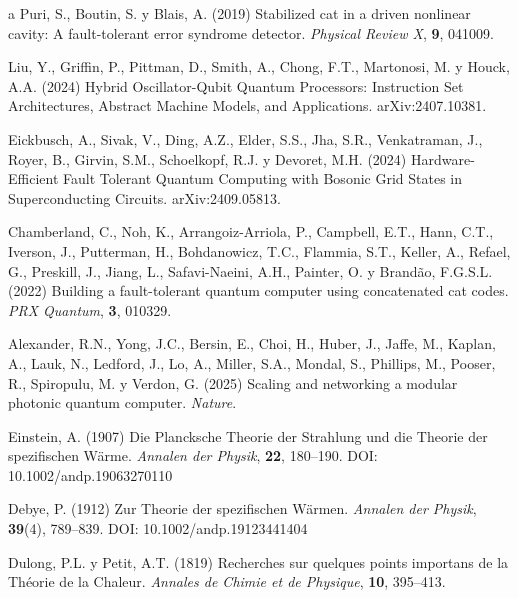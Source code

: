 \documentclass[11pt,a4paper,spanish]{book}
\begin{document}
\begin{thebibliography}{a}
		 Puri, S., Boutin, S. y Blais, A. (2019) Stabilized cat in a driven nonlinear cavity: A fault-tolerant error syndrome detector. \textit{Physical Review X}, \textbf{9}, 041009.
		
		
		 Liu, Y., Griffin, P., Pittman, D., Smith, A., Chong, F.T., Martonosi, M. y Houck, A.A. (2024) Hybrid Oscillator-Qubit Quantum Processors: Instruction Set Architectures, Abstract Machine Models, and Applications. arXiv:2407.10381.
		
		 Eickbusch, A., Sivak, V., Ding, A.Z., Elder, S.S., Jha, S.R., Venkatraman, J., Royer, B., Girvin, S.M., Schoelkopf, R.J. y Devoret, M.H. (2024) Hardware-Efficient Fault Tolerant Quantum Computing with Bosonic Grid States in Superconducting Circuits. arXiv:2409.05813.
		
		 Chamberland, C., Noh, K., Arrangoiz-Arriola, P., Campbell, E.T., Hann, C.T., Iverson, J., Putterman, H., Bohdanowicz, T.C., Flammia, S.T., Keller, A., Refael, G., Preskill, J., Jiang, L., Safavi-Naeini, A.H., Painter, O. y Brandão, F.G.S.L. (2022) Building a fault-tolerant quantum computer using concatenated cat codes. \textit{PRX Quantum}, \textbf{3}, 010329.
		
		 Alexander, R.N., Yong, J.C., Bersin, E., Choi, H., Huber, J., Jaffe, M., Kaplan, A., Lauk, N., Ledford, J., Lo, A., Miller, S.A., Mondal, S., Phillips, M., Pooser, R., Spiropulu, M. y Verdon, G. (2025) Scaling and networking a modular photonic quantum computer. \textit{Nature}.
		
		
		 Einstein, A. (1907) Die Plancksche Theorie der Strahlung und die Theorie der spezifischen Wärme. \textit{Annalen der Physik}, \textbf{22}, 180--190. DOI: 10.1002/andp.19063270110
		
		 Debye, P. (1912) Zur Theorie der spezifischen Wärmen. \textit{Annalen der Physik}, \textbf{39}(4), 789--839. DOI: 10.1002/andp.19123441404
		
		 Dulong, P.L. y Petit, A.T. (1819) Recherches sur quelques points importans de la Théorie de la Chaleur. \textit{Annales de Chimie et de Physique}, \textbf{10}, 395--413.
		
	\end{thebibliography}
	
\end{document}
